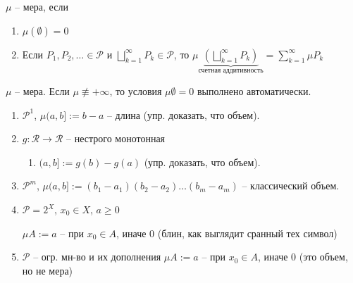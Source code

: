\begin{definition}
    $\mu$ -- мера, если 

    \begin{enumerate}
        \item $\mu(\emptyset) = 0$
        \item Если $P_1, P_2, \dots \in \mathcal{P}$ и $\bigsqcup_{k=1}^{\infty} P_k \in \mathcal{P}$, то $\mu \underbrace{\left(\bigsqcup_{k=1}^{\infty} P_k\right)}_{\text{счетная аддитивность}} = \sum_{k=1}^{\infty} \mu P_k$ 
    \end{enumerate}
\end{definition}

\begin{exerc}
    $\mu$ -- мера. Если $\mu \not \equiv +\infty$, то условия $\mu \emptyset = 0$ выполнено автоматически.
\end{exerc}

\begin{example}
    \begin{enumerate}
        \item $\mathcal{P}^1$,   \;\; $\mu (a, b] := b - a$ -- длина (упр. доказать, что объем).
        \item {
            $g: \mathcal{R} \rightarrow \mathcal{R}$ -- нестрого монотонная

            \begin{enumerate}
                \item $(a, b] := g(b) - g(a)$ (упр. доказать, что объем).
            \end{enumerate}
        }
        \item $\mathcal{P}^m$, \;\; $\mu (a, b] := (b_1 - a_1)(b_2 - a_2) \dots (b_m - a_m)$ -- классический объем.
        \item {
            $\mathcal{P} = 2^X$, \;\; $x_0 \in X$, \;\; $a \geq 0$
        
            $\mu A := a$ -- при $x_0 \in A$, иначе $0$ (блин, как выглядит сранный тех символ)
        }
        \item $\mathcal{P}$ -- огр. мн-во и их дополнения $\mu A := a$ -- при $x_0 \in A$, иначе $0$ (это объем, но не мера)
    \end{enumerate}
\end{example}


